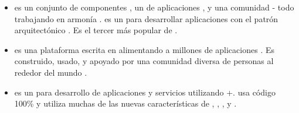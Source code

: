 \begin{itemize}
			\item
				\textbf{\symfonyNAME} es un conjunto de componentes \phpNAME, un \frameworkPC de aplicaciones \webINT, y una comunidad - todo trabajando en armonía \cite{online_technology_officialsite_symfony}. \symfonyNAME es un \softwarePC \freePC para desarrollar aplicaciones con el patrón arquitectónico \mvcAS. Es el tercer \frameworkPC más popular de \phpNAME \cite{online_popularity_php_proyects}.
			\item
				\textbf{\drupalNAME} es una plataforma \openSourcePC \contentManagementCOM escrita en \phpNAME alimentando a millones de aplicaciones  \websitesINT. Es construido, usado, y apoyado por una comunidad diversa de personas al rededor del mundo \cite{online_drupal_official_site}.
			\item
				\textbf{\zendNAME {}} es un \openSourcePC \frameworkPC para desarrollo de aplicaciones \webINT y servicios utilizando +. \zendNAME {} usa código 100\% \objectOrientedPL y utiliza muchas de las nuevas características de , \namelyNamespacesPL, \lateStaticBindPL, \lambdaFuncPL y \closuresPL \cite{online_zend_framework}.

\end{itemize}
